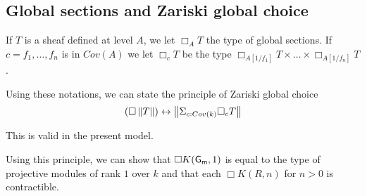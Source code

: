 

\subsection{Global sections and Zariski global choice}

If $T$ is a sheaf defined at level $A$, we let $\Box_A T$ the type of global sections.
If $c = f_1,\dots,f_n$ is in $Cov(A)$ we let $\Box_c T$ be the type $\Box_{A[1/f_1]}T\times\dots\times\Box_{A[1/f_n]}T$.

Using these notations, we can state the principle of Zariski global choice
$$
(\Box \left\lVert T \right\rVert)\leftrightarrow \left\lVert \Sigma_{c:Cov(k)}\Box_c T \right\rVert
$$

This is valid in the present model.

Using this principle, we can show that $\Box K(\mathsf{G_m},1)$ is equal to the type of projective modules of rank $1$ over $k$
and that each $\Box K(R,n)$ for $n>0$ is contractible.
                                                                                  




 
